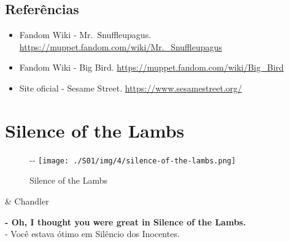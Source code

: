 \hypertarget{referuxeancias-4}{%
\subsection{Referências}\label{referuxeancias-4}}

\begin{itemize}
\tightlist
\item
  \sloppy Fandom Wiki - Mr. Snuffleupagus. \url{https://muppet.fandom.com/wiki/Mr._Snuffleupagus}
\item
  \sloppy Fandom Wiki - Big Bird. \url{https://muppet.fandom.com/wiki/Big_Bird}
\item
  \sloppy Site oficial - Sesame Street. \url{https://www.sesamestreet.org/}
\end{itemize}

\hypertarget{silence-of-the-lambs}{%
\section{Silence of the Lambs}\label{silence-of-the-lambs}}

\begin{figure}[!ht]
  \begin{adjustwidth}{-\oddsidemargin-1in}{-\rightmargin}
    \centering
    \texttt{[image: ./S01/img/4/silence-of-the-lambs.png]}
    \caption{Silence of the Lambs\label{fig:silence-of-the-lambs}}
  \end{adjustwidth}
\end{figure}

\begin{tcolorbox}[enhanced,center upper,
    drop fuzzy shadow southeast, boxrule=0.3pt,
    lower separated=false,
    colframe=black!30!dialogoBorder,colback=white]
\begin{minipage}[c]{0.14\linewidth}
   & \centering \scriptsize{Chandler}
\end{minipage}
\hspace{.1mm}
\begin{minipage}[c]{0.8\linewidth}
  \textbf{- Oh, I thought you were great in Silence of the Lambs.}\\
  - Você estava ótimo em Silêncio dos Inocentes.
\end{minipage}
\end{tcolorbox}

